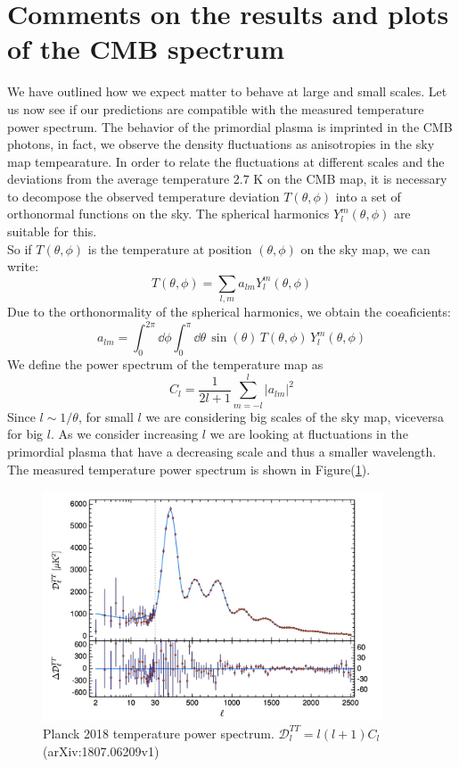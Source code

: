 \documentclass{article}
\begin{document}
\section{Comments on the results and plots of the CMB spectrum}
We have outlined how we expect matter to behave at large and small scales.
Let us now see if our predictions are compatible with the measured temperature power spectrum.
The behavior of the primordial plasma is imprinted in the CMB photons, in fact, we observe the density fluctuations as anisotropies in the sky map tempearature.
In order to relate the fluctuations at different scales and the deviations from the average temperature $2.7$ K on the CMB map, it is necessary to decompose the observed temperature deviation $T(\theta, \phi)$ into a set of orthonormal functions on the sky.
The spherical harmonics $Y^{m} _{l} (\theta, \phi)$ are suitable for this.\\
So if $T(\theta,\phi)$ is the temperature at position $(\theta,\phi)$ on the sky map,
we can write:
\begin{equation}
T(\theta, \phi) = \sum _{l, m} a_{lm} Y^{m} _l (\theta, \phi)
\end{equation}
Due to the orthonormality of the spherical harmonics, we obtain the coeaficients:
\begin{equation}
a_{lm} = \int _0 ^{2 \pi} \dd \phi \int _0  ^{\pi} \dd \theta \,
\sin( \theta) \, T(\theta, \phi) \, Y^{m} _l (\theta, \phi)
 \end{equation}
We define the power spectrum of the temperature map as 
 \begin{equation}
 C_l = \dfrac{1}{2l+1} \sum _{m=-l} ^{l} |a_{lm}|^2
 \end{equation}
Since $l \sim 1/ \theta$, for small $l$ we are considering big scales of the sky map, viceversa for big $l$.
As we consider increasing $l$ we are looking at fluctuations in the primordial plasma that have a decreasing  scale and thus a smaller wavelength.\\
The measured temperature power spectrum is shown in Figure(\ref{temp_pow_spect}).
%
%
%
\begin{figure}
\centering
\includegraphics[width=0.9\textwidth]{planck2018}
\caption{Planck 2018 temperature power spectrum. $\mathcal{D}^{TT}_l = l(l+1)C_l$ (arXiv:1807.06209v1)}
\label{temp_pow_spect}
\end{figure}
\end{document}
